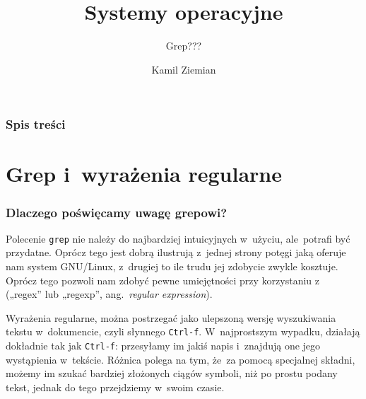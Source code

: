 \documentclass[10pt,t]{beamer}
\title{Systemy operacyjne}
\subtitle{Grep???}
\author{Kamil Ziemian \\
  \email}
\begin{document}





\RaggedRight





\maketitle





\begin{frame}
  \frametitle{Spis treści}


  \tableofcontents

\end{frame}





\section{Grep i~wyrażenia regularne}


\begin{frame}
  \frametitle{Dlaczego poświęcamy uwagę grepowi?}


  Polecenie \texttt{grep} nie należy do najbardziej intuicyjnych w~użyciu,
  ale~potrafi być przydatne. Oprócz tego jest dobrą ilustrują z~jednej
  strony potęgi jaką oferuje nam system GNU/Linux, z~drugiej to ile
  trudu jej zdobycie zwykle kosztuje. Oprócz tego pozwoli nam zdobyć
  pewne umiejętności przy korzystaniu
  z~ („regex” lub „regexp”, ang.~\textit{regular expression}).

  Wyrażenia regularne, można postrzegać jako ulepszoną wersję wyszukiwania
  tekstu w~dokumencie, czyli słynnego \texttt{Ctrl-f}. W~najprostszym
  wypadku, działają dokładnie tak jak \texttt{Ctrl-f}: przesyłamy im
  jakiś napis i~znajdują one jego wystąpienia w~tekście. Różnica polega na
  tym, że~za pomocą specjalnej składni, możemy im szukać bardziej złożonych
  ciągów symboli, niż po prostu podany tekst, jednak do tego przejdziemy
  w~swoim czasie.

\end{frame}
\end{document}
